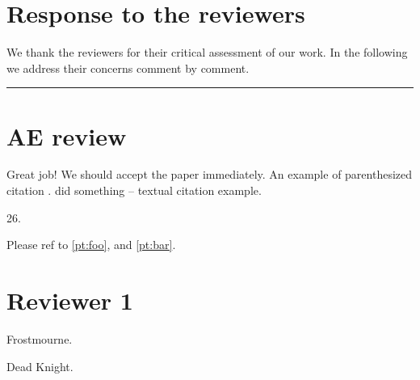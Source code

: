 \documentclass{response}
\begin{document}
\section*{Response to the reviewers}
We thank the reviewers for their critical assessment of our work.
In the following we address their concerns comment by comment.
\bigskip
\hrule
\section{AE review}
Great job! We should accept the paper immediately. An example of parenthesized citation \citep{pearl2009causality}. \citet{pearl2009causality} did something -- textual citation example.

\begin{comment}
How old are you?
\end{comment}

\begin{response}
	26.
\end{response}

\begin{comment}
What's your weapon and What's your name?
\end{comment}

\begin{response}
	Please ref to \ref{pt:foo}, and \ref{pt:bar}.
\end{response}

\section{Reviewer 1}

\begin{comment}\label{pt:foo}
What's your weapon?
\end{comment}

\begin{response}
	Frostmourne.
\end{response}

\begin{comment}\label{pt:bar}
What's your name?
\end{comment}

\begin{response}
	Dead Knight.
\end{response}
\printbibliography
\end{document}
